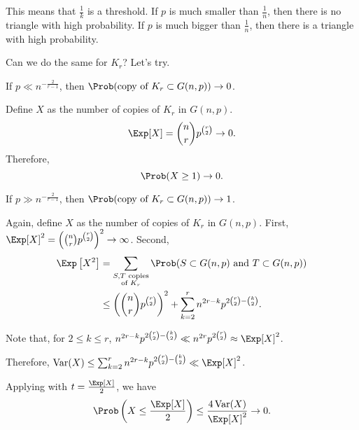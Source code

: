 This means that $\frac{1}{k}$ is a threshold. If $p$ is much smaller than $\frac{1}{n}$, then there is no triangle with high probability. If $p$ is much bigger than $\frac{1}{n}$, then there is a triangle with high probability. 

Can we do the same for $K_r$? Let's try.

\begin{prop}
	If $p \ll n^{-\frac{2}{r-1}}$, then $\Prob(\text{copy of } K_r \subset G(n, p)) \to 0$.
\end{prop}

\begin{dem}
	Define $X$ as the number of copies of $K_r$ in $G(n, p)$. \[ \Exp[X] = \binom{n}{r} p^{\binom{r}{2}} \to 0.\]
	Therefore, \[ \Prob(X \ge 1) \to 0.\]	
\end{dem}


\begin{prop}
	If $p \gg n^{-\frac{2}{r-1}}$, then $\Prob(\text{copy of } K_r \subset G(n, p)) \to 1$.		
\end{prop}

\begin{dem}
	Again, define $X$ as the number of copies of $K_r$ in $G(n, p)$. First, $\Exp[X]^2 = \left(\binom{n}{r}p^{\binom{r}{2}}\right)^2 \to \infty$. Second,
	\begin{align*} \Exp\left[X^2\right] &= \sum_{\substack{S, T\text{ copies}\\\text{of }K_r}} \Prob(S \subset G(n, p) \text{ and } T \subset G(n, p)) \\
		&\le \left(\binom{n}{r}p^{\binom{r}{2}}\right)^2 + \sum_{k=2}^r n^{2r-k} p^{2\binom{r}{2} - \binom{k}{2}}.
	\end{align*}

	Note that, for $2 \le k \le r$, $n^{2r-k}p^{2\binom{r}{2} - \binom{k}{2}} \ll n^{2r}p^{2\binom{r}{2}} \approx \Exp[X]^2$.

	Therefore, $\Var(X) \le \sum_{k=2}^r n^{2r-k} p^{2\binom{r}{2} - \binom{k}{2}}\ll \Exp[X]^2$.
	
	Applying  with $t = \frac{\Exp[X]}{2}$, we have
	\[
		\Prob\left(X \le \frac{\Exp[X]}{2}\right) \le \frac{4\Var(X)}{\Exp[X]^2} \to 0.
	\]
\end{dem}
